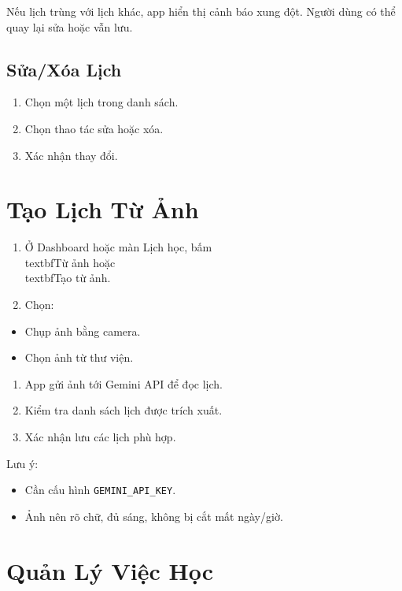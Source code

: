\documentclass[12pt,a4paper]{report}
\begin{document}
Nếu lịch trùng với lịch khác, app hiển thị cảnh báo xung đột. Người dùng có thể quay lại sửa hoặc vẫn lưu.

\subsection{Sửa/Xóa Lịch}

\begin{enumerate}
\item Chọn một lịch trong danh sách.
\item Chọn thao tác sửa hoặc xóa.
\item Xác nhận thay đổi.
\end{enumerate}

\section{Tạo Lịch Từ Ảnh}

\begin{enumerate}
\item Ở Dashboard hoặc màn Lịch học, bấm \\textbf{Từ ảnh} hoặc \\textbf{Tạo từ ảnh}.
\item Chọn:
\end{enumerate}
\begin{itemize}
\item Chụp ảnh bằng camera.
\item Chọn ảnh từ thư viện.
\end{itemize}
\begin{enumerate}
\item App gửi ảnh tới Gemini API để đọc lịch.
\item Kiểm tra danh sách lịch được trích xuất.
\item Xác nhận lưu các lịch phù hợp.
\end{enumerate}

Lưu ý:

\begin{itemize}
\item Cần cấu hình \texttt{GEMINI\_API\_KEY}.
\item Ảnh nên rõ chữ, đủ sáng, không bị cắt mất ngày/giờ.
\end{itemize}

\section{Quản Lý Việc Học}
\end{document}
